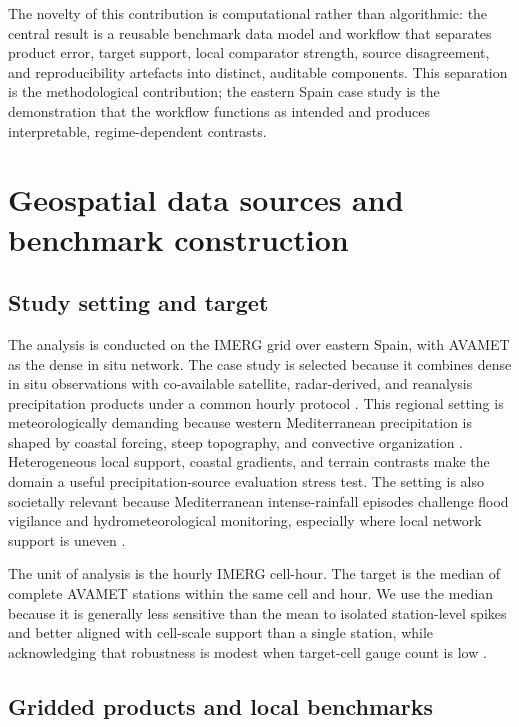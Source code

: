 \documentclass[preprint,12pt]{elsarticle}
\begin{document}
The novelty of this contribution is computational rather than algorithmic: the central result is a reusable benchmark data model and workflow that separates product error, target support, local comparator strength, source disagreement, and reproducibility artefacts into distinct, auditable components. This separation is the methodological contribution; the eastern Spain case study is the demonstration that the workflow functions as intended and produces interpretable, regime-dependent contrasts.

\section{Geospatial data sources and benchmark construction}

\subsection{Study setting and target}

The analysis is conducted on the IMERG grid over eastern Spain, with AVAMET as the dense in situ network. The case study is selected because it combines dense in situ observations with co-available satellite, radar-derived, and reanalysis precipitation products under a common hourly protocol \citep{peino2024westernmed,gomiscebolla2023spain}. This regional setting is meteorologically demanding because western Mediterranean precipitation is shaped by coastal forcing, steep topography, and convective organization \citep{khodayar2021hymex}. Heterogeneous local support, coastal gradients, and terrain contrasts make the domain a useful precipitation-source evaluation stress test. The setting is also societally relevant because Mediterranean intense-rainfall episodes challenge flood vigilance and hydrometeorological monitoring, especially where local network support is uneven \citep{derin2016complexterrain,yu2020highdensity,peino2024westernmed,gomiscebolla2023spain}.

The unit of analysis is the hourly IMERG cell-hour. The target is the median of complete AVAMET stations within the same cell and hour. We use the median because it is generally less sensitive than the mean to isolated station-level spikes and better aligned with cell-scale support than a single station, while acknowledging that robustness is modest when target-cell gauge count is low \citep{tessema2020representativeness,tozer2012proxy}.

\subsection{Gridded products and local benchmarks}
\end{document}
